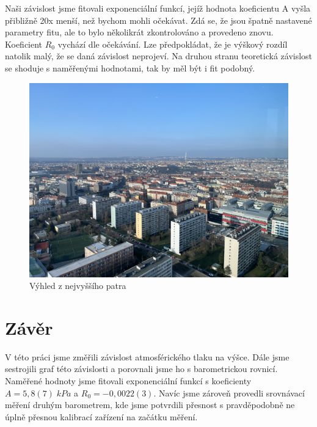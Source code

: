 Naši závislost jsme fitovali exponenciální funkcí, jejíž hodnota koeficientu A vyšla přibližně 20x menší, než bychom mohli očekávat. Zdá se, že jsou špatně nastavené parametry fitu, ale to bylo několikrát zkontrolováno a provedeno znovu. Koeficient $R_0$ vychází dle očekávání. Lze předpokládat, že je výškový rozdíl natolik malý, že se daná závislost neprojeví. Na druhou stranu teoretická závislost se shoduje s naměřenými hodnotami, tak by měl být i fit podobný.

\newpage

\begin{figure}
    \centering
    \includegraphics[width=0.75\linewidth]{Y1 - Závislost atmosférického tlaku na výšce – výletní//Protokol - závislost atmosférického tlaku na výšce – výletní//img/IMG_4358.jpg}
    \caption{Výhled z nejvyššího patra}
    \label{fig:vyhled}
\end{figure}

\section{Závěr}

V této práci jsme změřili závislost atmosférického tlaku na výšce. Dále jsme sestrojili graf této závislosti a porovnali jsme ho s barometrickou rovnicí. Naměřené hodnoty jsme fitovali exponenciální funkcí s koeficienty $A = 5,8(7) \; kPa$ a $R_0 = -0,0022(3)$. Navíc jsme zároveň provedli srovnávací měření druhým barometrem, kde jsme potvrdili přesnost s pravděpodobně ne úplně přesnou kalibrací zařízení na začátku měření.